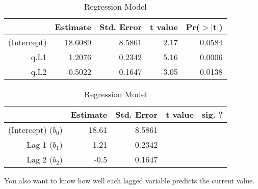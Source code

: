 \documentclass[11pt]{exam}
\begin{document}
\begin{questions}
\ifprintanswers
\begin{table}[ht]
\begin{center}
\begin{tabular}{rrrrr}
  \hline
 & Estimate & Std. Error & t value & Pr($>$$|$t$|$) \\ 
  \hline
(Intercept) & 18.6089 & 8.5861 & 2.17 & 0.0584 \\ 
  q.L1 & 1.2076 & 0.2342 & 5.16 & 0.0006 \\ 
  q.L2 & -0.5022 & 0.1647 & -3.05 & 0.0138 \\ 
   \hline
\end{tabular}
\caption{Regression Model}
\label{tab:quake-fit}
\end{center}
\end{table}\else
\begin{table}[ht]
\begin{center}
\begin{tabular}{rrrrr}
  \hline
  & Estimate & Std. Error & t value & sig. ? \\ 
  \hline
(Intercept) ($b_0$) &  18.61  &  8.5861  & &\\
Lag 1 ($b_1$) &  1.21  &  0.2342  & &\\
Lag 2 ($b_2$) &  -0.5  &  0.1647  & &\\
  \hline
\end{tabular}
\caption{Regression Model}
\label{tab:quake-fit}
\end{center}
\end{table}
\fi


  \question You also want to know how well each lagged variable predicts the
  current value.
\end{questions}
\end{document}

